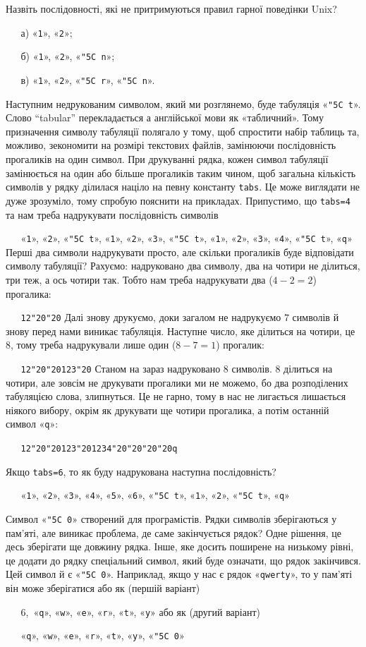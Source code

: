 \documentclass{book}
\newcommand{\escape}[1]{\texttt{\char"5C #1}}
\newcommand{\textseq}[1]{\par\vbox{\texttt{~~~}#1}}
\newcommand{\id}[1]{\texttt{#1}}
\newcommand{\chr}[1]{«\texttt{#1}»}
\newcommand{\s}{\char"20}
\newcommand{\chesc}[1]{\chr{\escape{#1}}}
\begin{document}
\begin{exercise}
Назвіть послідовності, які не притримуються правил гарної поведінки Unix?

\textseq{а) \chr1, \chr2;}
\textseq{б) \chr1, \chr2, \chesc n;}
\textseq{в) \chr1, \chr2, \chesc r, \chesc n.}
\end{exercise}

Наступним недрукованим символом, який ми розглянемо, буде табуляція \chesc t.
Слово “tabular” перекладається а англійської мови як «табличний».
Тому призначення символу табуляції полягало у тому, щоб спростити набір таблиць та, можливо, зекономити на розмірі текстових файлів, замінюючи послідовність прогаликів на один символ.
При друкуванні рядка, кожен символ табуляції замінюється на один або більше прогаликів таким чином, щоб загальна кількість символів у рядку ділилася націло на певну константу \id{tabs}.
Це може виглядати не дуже зрозуміло, тому спробую пояснити на прикладах.
Припустимо, що \id{tabs=4} та нам треба надрукувати послідовність символів
\textseq{\chr1, \chr2, \chesc t, \chr1, \chr2, \chr3, \chesc t, \chr1, \chr2, \chr3, \chr4, \chesc t, \chr q}
Перші два символи надрукувати просто, але скільки прогаликів буде відповідати символу табуляції?
Рахуємо: надруковано два символу, два на чотири не ділиться, три теж, а ось чотири так.
Тобто нам треба надрукувати два ($4-2=2$) прогалика:
\textseq{\id{12\s\s}}
Далі знову друкуємо, доки загалом не надрукуємо $7$ символів й знову перед нами виникає табуляція.
Наступне число, яке ділиться на чотири, це $8$, тому треба надрукували лише один ($8-7=1$) прогалик:
\textseq{\id{12\s\s{}123\s}}
Станом на зараз надруковано $8$ символів.
$8$ ділиться на чотири, але зовсім не друкувати прогалики ми не можемо, бо два розподілених табуляцією слова, злипнуться.
Це не гарно, тому в нас не лигається лишається ніякого вибору, окрім як друкувати ще чотири прогалика, а потім останній символ \chr q:
\textseq{\id{12\s\s{}123\s{}1234\s\s\s\s{}q}}

\goodbreak
\begin{exercise}
Якщо \id{tabs=6}, то як буду надрукована наступна послідовність?
\textseq{\chr1, \chr2, \chr3, \chr4, \chr5, \chr6, \chesc t, \chr1, \chr2, \chesc t, \chr q}
\end{exercise}

Символ \chesc 0 створений для програмістів.
Рядки символів зберігаються у пам'яті, але виникає проблема, де саме закінчується рядок?
Одне рішення, це десь зберігати ще довжину рядка.
Інше, яке досить поширене на низькому рівні, це додати до рядку спеціальний символ, який буде означати, що рядок закінчився.
Цей символ й є \chesc 0.
Наприклад, якщо у нас є рядок \chr{qwerty}, то у пам'яті він може зберігатися або як (першій варіант)
\textseq{\textrm{$6$,}~\chr q, \chr w, \chr e, \chr r, \chr t, \chr y}
\noindent або як (другий варіант)
\textseq{\chr q, \chr w, \chr e, \chr r, \chr t, \chr y, \chesc 0}
\end{document}
